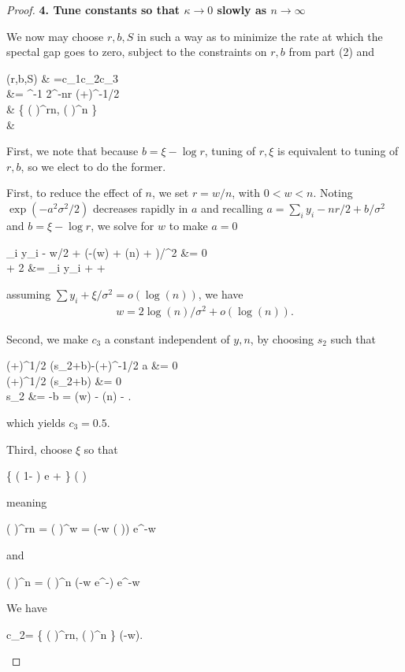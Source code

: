 \documentclass[twoside,11pt]{article}
\newcommand{\be}{\begin{equs}}
\newcommand{\ee}{\end{equs}}
\newcommand{\1}{\mathbf 1}
\begin{document}
{\begin{proof}
\textbf{4. Tune constants so that $\kappa \to 0$ slowly as $n \to \infty$} %

We now may choose $r,b,S$ in such a way as to minimize the rate at which the spectal gap goes to zero, subject to the constraints on $r,b$ from part (2) and 
\be
\kappa(r,b,S) &   =c_1c_2c_3 
\\&= 
{\sigma^{-1}} 2^{-nr}  (+)^{-1/2} 
\exp {} 
\exp {}\\
& \times \min\bigg \{
\bigg( \bigg)^{rn},
\bigg( \bigg)^n
\bigg\}\\
&  \times \Phi{} 
\ee
First, we note that because $b = \xi - \log r$, tuning of $r,\xi$ is equivalent to tuning of $r,b$, so we elect to do the former. 


First, to reduce the effect of $n$, we set $r=w/n$, with $0<w<n$. Noting $ \exp (- {a^2 \sigma^2  }/{2})$ decreases rapidly in $a$ and recalling $a= \sum_i y_i - nr/2 + b/\sigma^2$ and $b = \xi - \log r$, we solve for $w$ to make $a=0$
\be    
\sum_i y_i - w/2 + (-\log(w) + \log(n) + \xi)/\sigma^2 &= 0 \\
 + 2 &= \sum_i y_i +  + 
\ee


assuming $\sum y_i + \xi /\sigma^2 = o(\log (n))$, we have %
\begin{equation*}
\begin{aligned}
w = 2\log(n)/\sigma^2  + o(\log(n)).
\end{aligned}
\end{equation*}

Second, we make $c_3$ a constant independent of $y,n$, by choosing $s_2$ such that
\be
(+)^{1/2} (s_2+b)-(+)^{-1/2} a &= 0 \\
(+)^{1/2} (s_2+b) &= 0 \\
s_2 &= -b = \log(w) - \log(n) - \xi.
\ee
which yields $c_3=0.5$. 

Third, choose $\xi$ so that
\be
\xi \le \log\left\{ \left( 1-  \right) e +  \right\} \Longrightarrow \log \left(  \right) 
\ee
meaning
\be
\bigg( \bigg)^{rn} = 
\bigg( \bigg)^{w} = \exp\left(-w \log\bigg( \bigg)\right) \ge e^{-w}
\ee
and
\be
\bigg( \bigg)^n =  \bigg( \bigg)^n
\ge \exp(-w e^{-\xi}) \ge e^{-w} 
\ee
We have
\be
c_2= \min\bigg \{
\bigg( \bigg)^{rn},
\bigg( \bigg)^n
\bigg\} \ge \exp(-w).
\ee


\end{proof}}
\end{document}
